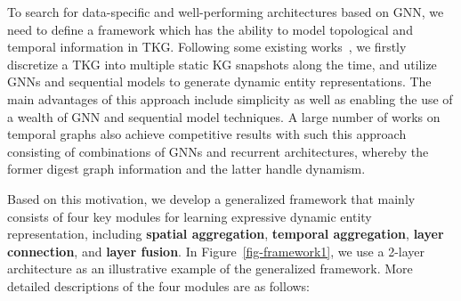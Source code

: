 \documentclass[11pt]{article}
\begin{document}
To search for data-specific and well-performing architectures based on GNN, 
we need to define a framework 
which has the ability to model topological and temporal information in TKG.
Following some existing works~\citep{taheri2019learning, sankar2020dysat, manessi2020dynamic,wu-etal-2020-temp,gao2022a,wang2022evolutionary},
we firstly discretize a TKG into multiple static KG snapshots along the time,
and utilize GNNs and sequential models to generate dynamic entity representations.
The main advantages of this approach 
include simplicity as well as 
enabling the use of a wealth of GNN and sequential model techniques.
A large number of works on temporal graphs also achieve competitive results with such this approach consisting of combinations of GNNs and recurrent architectures,
whereby the former digest graph information and the latter handle dynamism. 

Based on this motivation,
we develop a generalized framework that 
mainly consists of four key modules 
for learning expressive dynamic entity representation, 
including 
\textbf{spatial aggregation},
\textbf{temporal aggregation}, 
\textbf{layer connection}, 
and \textbf{layer fusion}. 
In Figure~\ref{fig-framework1},
we use a 2-layer architecture 
as an illustrative example of the generalized framework. 
More detailed descriptions of the four modules are as follows:
\end{document}
